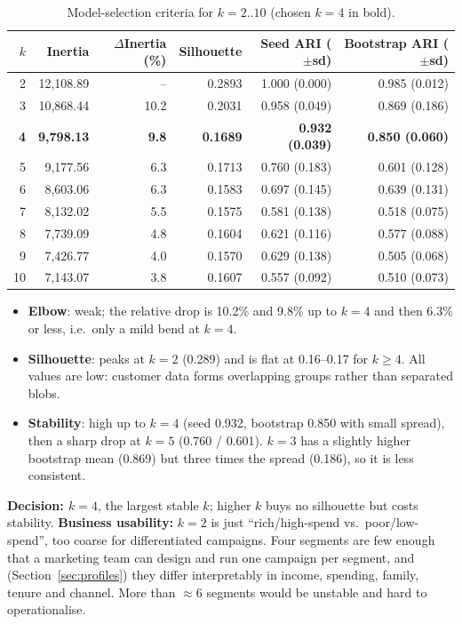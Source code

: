 \documentclass[11pt]{article}
\begin{document}
\begin{table}[H]\centering\small
\caption{Model-selection criteria for $k=2..10$ (chosen $k=4$ in bold).}\label{tab:ksel}
\begin{tabular}{@{}rrrrrr@{}}\toprule
$k$ & Inertia & $\Delta$Inertia (\%) & Silhouette & Seed ARI ($\pm$sd) & Bootstrap ARI ($\pm$sd)\\\midrule
2 & 12{,}108.89 & -- & 0.2893 & 1.000 (0.000) & 0.985 (0.012)\\
3 & 10{,}868.44 & 10.2 & 0.2031 & 0.958 (0.049) & 0.869 (0.186)\\
\textbf{4} & \textbf{9{,}798.13} & \textbf{9.8} & \textbf{0.1689} & \textbf{0.932 (0.039)} & \textbf{0.850 (0.060)}\\
5 & 9{,}177.56 & 6.3 & 0.1713 & 0.760 (0.183) & 0.601 (0.128)\\
6 & 8{,}603.06 & 6.3 & 0.1583 & 0.697 (0.145) & 0.639 (0.131)\\
7 & 8{,}132.02 & 5.5 & 0.1575 & 0.581 (0.138) & 0.518 (0.075)\\
8 & 7{,}739.09 & 4.8 & 0.1604 & 0.621 (0.116) & 0.577 (0.088)\\
9 & 7{,}426.77 & 4.0 & 0.1570 & 0.629 (0.138) & 0.505 (0.068)\\
10 & 7{,}143.07 & 3.8 & 0.1607 & 0.557 (0.092) & 0.510 (0.073)\\\bottomrule
\end{tabular}\end{table}

\begin{itemize}
\item \textbf{Elbow}: weak; the relative drop is 10.2\% and 9.8\% up to $k=4$ and then 6.3\% or
less, i.e.\ only a mild bend at $k=4$.
\item \textbf{Silhouette}: peaks at $k=2$ (0.289) and is flat at 0.16--0.17 for $k\ge4$. All values
are low: customer data forms overlapping groups rather than separated blobs.
\item \textbf{Stability}: high up to $k=4$ (seed 0.932, bootstrap 0.850 with small spread), then a
sharp drop at $k=5$ (0.760 / 0.601). $k=3$ has a slightly higher bootstrap mean (0.869) but three
times the spread (0.186), so it is less consistent.
\end{itemize}
\textbf{Decision: $k=4$}, the largest stable $k$; higher $k$ buys no silhouette but costs stability.
\textbf{Business usability:} $k=2$ is just ``rich/high-spend vs.\ poor/low-spend'', too coarse for
differentiated campaigns. Four segments are few enough that a marketing team can design and run one
campaign per segment, and (Section~\ref{sec:profiles}) they differ interpretably in income,
spending, family, tenure and channel. More than $\approx$6 segments would be unstable and
hard to operationalise.
\end{document}
